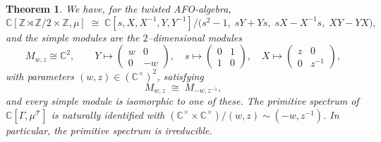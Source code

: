 \documentclass[10pt,a4paper]{amsart}
\newtheorem{theorem}{Theorem}
\newcommand{\C}{\mathbb{C}}
\newcommand{\Z}{\mathbb{Z}}
\begin{document}
\begin{theorem}\label{thm:simples-expanded}
We have, for the twisted AFO-algebra,
\[
\C[\Z\rtimes\Z/2 \times \Z, \mu]
\;\cong\;
\C[s,X,X^{-1},Y,Y^{-1}]
\Big/\bigl(s^2-1,\; sY+Ys,\; sX-X^{-1}s,\; XY-YX\bigr),
\]
and the simple modules are the $2$--dimensional modules
\[
M_{w,z}\cong \C^2,\qquad
Y\mapsto\begin{pmatrix} w&0\\0&-w\end{pmatrix},\quad
s\mapsto\begin{pmatrix}0&1\\1&0\end{pmatrix},\quad
X\mapsto\begin{pmatrix} z&0\\0&z^{-1}\end{pmatrix},
\]
with parameters $(w,z)\in(\C^\times)^2$, satisfying
\[
M_{w,z}\;\cong\; M_{-w,z^{-1}},
\]
and every simple module is isomorphic to one of these.
The primitive spectrum of $\C[\Gamma, \mu^{\mathcal{T}}]$  is naturally identified with $(\C^\times \times \C^\times) / (w,z) \sim (-w, z^{-1})$.   
In particular, the primitive spectrum is irreducible.
\end{theorem}
\end{document}
